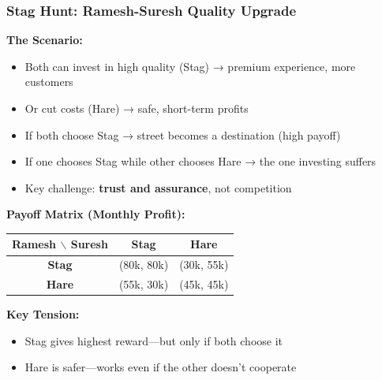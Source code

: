 \begin{frame}[fragile]\frametitle{Stag Hunt: Ramesh-Suresh Quality Upgrade}

\textbf{The Scenario:}
\begin{itemize}
  \item Both can invest in high quality (Stag) → premium experience, more customers
  \item Or cut costs (Hare) → safe, short-term profits
  \item If both choose Stag → street becomes a destination (high payoff)
  \item If one chooses Stag while other chooses Hare → the one investing suffers
  \item Key challenge: \textbf{trust and assurance}, not competition
\end{itemize}

\vspace{6pt}

\textbf{Payoff Matrix (Monthly Profit):}

\begin{center}
\begin{tabular}{|c|c|c|}
  \hline
  \textbf{Ramesh $\backslash$ Suresh} & \textbf{Stag} & \textbf{Hare} \\
  \hline
  \textbf{Stag} & (80k, 80k) & (30k, 55k) \\
  \hline
  \textbf{Hare} & (55k, 30k) & (45k, 45k) \\
  \hline
\end{tabular}
\end{center}

\vspace{6pt}

\textbf{Key Tension:}
\begin{itemize}
  \item Stag gives highest reward—but only if both choose it
  \item Hare is safer—works even if the other doesn’t cooperate
\end{itemize}

\end{frame}

